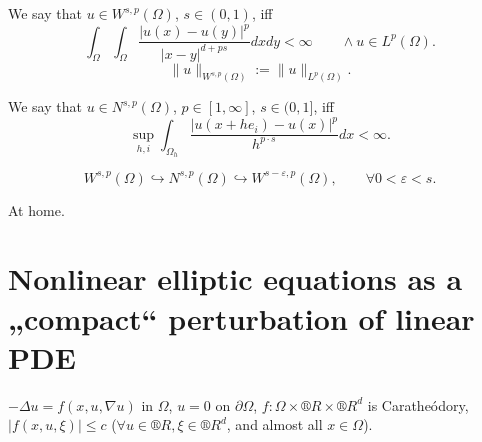 \documentclass[12pt]{article}					%
\begin{document}
\begin{definice}
	We say that $u \in W^{s, p}(Ω)$, $s \in (0, 1)$, iff
	$$ \int_Ω \int_Ω \frac{|u(x) - u(y)|^p}{|x - y|^{d + ps}} dx dy < ∞ \qquad \land u \in L^p(Ω). $$
	$$ \|u\|_{W^{s, p}(Ω)} := \|u\|_{L^p(Ω)}. $$
\end{definice}

\begin{definice}
	We say that $u \in N^{s, p}(Ω)$, $p \in [1, ∞]$, $s \in (0, 1]$, iff
	$$ \sup_{h, i} \int_{Ω_h} \frac{|u(x + h e_i) - u(x)|^p}{h^{p·s}} dx < ∞. $$
\end{definice}

\begin{lemma}
	$$ W^{s, p}(Ω) \hookrightarrow N^{s, p}(Ω) \hookrightarrow W^{s - ε, p}(Ω), \qquad \forall 0 < ε < s. $$
	
	\begin{dukazin}
		At home.
	\end{dukazin}
\end{lemma}


\section{Nonlinear elliptic equations as a „compact“ perturbation of linear PDE}
\begin{poznamka}
	$-Δu = f(x, u, \nabla u)$ in $Ω$, $u = 0$ on $\partial Ω$, $f: Ω \times ®R \times ®R^d$ is Caratheódory, $|f(x, u, ξ)| ≤ c$ ($\forall u \in ®R, ξ \in ®R^d$, and almost all $x \in Ω$).
\end{poznamka}
\end{document}
